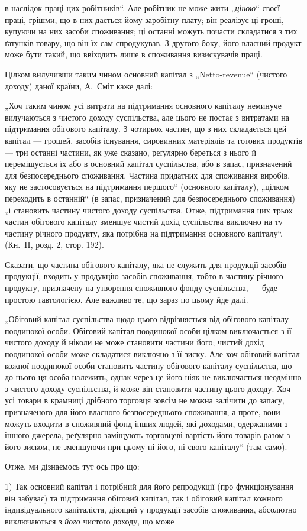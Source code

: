 \parcont{}  %
в наслідок праці цих робітників“. Але робітник не може жити „\emph{ціною}“
своєї праці, грішми, що в них дається йому заробітну плату; він реалізує
ці гроші, купуючи на них засоби споживання; ці останні можуть
почасти складатися з тих ґатунків товару, що він їх сам спродукував.
З другого боку, його власний продукт може бути такий, що ввіходить
лише в споживання визискувачів праці.

Цілком вилучивши таким чином основний капітал з „Netto-revenue“
(чистого доходу) даної країни, А.~Сміт каже далі:

„Хоч таким чином усі витрати на підтримання основного капіталу
неминуче вилучаються з чистого доходу суспільства, але цього не постає
з витратами на підтримання обігового капіталу. З чотирьох частин, що
з них складається цей капітал — грошей, засобів існування, сировинних
матеріялів та готових продуктів — три останні частини, як уже сказано,
реґулярно береться з нього й переміщується їх або в основний капітал
суспільства, або в запас, призначений для безпосереднього споживання.
Частина придатних для споживання виробів, яку не застосовується на
підтримання першого“ (основного капіталу), „цілком переходить в останній“
(в запас, призначений для безпосереднього споживання) „і становить
частину чистого доходу суспільства. Отже, підтримання цих трьох
частин обігового капіталу зменшує чистий дохід суспільства виключно
на ту частину річного продукту, яка потрібна на підтримання основного
капіталу“. (Кн.~II, розд. 2, стор. 192).

Сказати, що частина обігового капіталу, яка не служить для продукції
засобів продукції, входить у продукцію засобів споживання, тобто в частину
річного продукту, призначену на утворення споживного фонду
суспільства, — буде простою тавтологією. Але важливо те, що зараз по
цьому йде далі.

„Обіговий капітал суспільства щодо цього відрізняється від обігового
капіталу поодинокої особи. Обіговий капітал поодинокої особи цілком
виключається з її чистого доходу й ніколи не може становити частини
його; чистий дохід поодинокої особи може складатися виключно з її
зиску. Але хоч обіговий капітал кожної поодинокої особи становить
частину обігового капіталу суспільства, що до нього ця особа належить,
однак через це його ніяк не виключається неодмінно з чистого доходу
суспільства, й може він становити частину цього доходу. Хоч усі товари
в крамниці дрібного торговця зовсім не можна залічити до запасу, призначеного
для його власного безпосереднього споживання, а проте, вони
можуть входити в споживний фонд інших людей, які доходами, одержаними
з іншого джерела, реґулярно заміщують торговцеві вартість його
товарів разом з його зиском, не зменшуючи при цьому ні його, ні свого
капіталу“ (там само).

Отже, ми дізнаємось тут ось про що:

1) Так основний капітал і потрібний для його репродукції (про функціонування
він забуває) та підтримання обіговий капітал, так і обіговий
капітал кожного індивідуального капіталіста, діющий у продукції засобів
споживання, абсолютно виключаються з \emph{його} чистого доходу, що може
\parbreak{}  %
